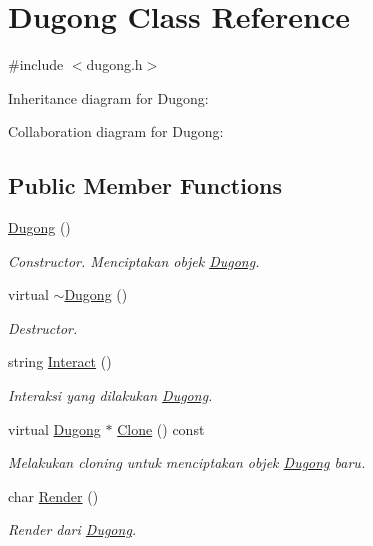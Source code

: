 \hypertarget{classDugong}{}\section{Dugong Class Reference}
\label{classDugong}


{\ttfamily \#include $<$dugong.\+h$>$}



Inheritance diagram for Dugong\+:


Collaboration diagram for Dugong\+:
\subsection*{Public Member Functions}
\begin{DoxyCompactItemize}
\item 
\hyperlink{classDugong_ab18a993807c0daa4b4a7eeaf7118ead7}{Dugong} ()
\begin{DoxyCompactList}\small\item\em Constructor. Menciptakan objek \hyperlink{classDugong}{Dugong}. \end{DoxyCompactList}\item 
virtual \hyperlink{classDugong_a0fe188826a301ecf2b90f2eb60c9e5da}{$\sim$\+Dugong} ()
\begin{DoxyCompactList}\small\item\em Destructor. \end{DoxyCompactList}\item 
string \hyperlink{classDugong_a861c589c05a791faf03297eb6e718d9e}{Interact} ()
\begin{DoxyCompactList}\small\item\em Interaksi yang dilakukan \hyperlink{classDugong}{Dugong}. \end{DoxyCompactList}\item 
virtual \hyperlink{classDugong}{Dugong} $\ast$ \hyperlink{classDugong_a8209b4208bd32dfc0fa4e701679306c1}{Clone} () const 
\begin{DoxyCompactList}\small\item\em Melakukan cloning untuk menciptakan objek \hyperlink{classDugong}{Dugong} baru. \end{DoxyCompactList}\item 
char \hyperlink{classDugong_af82a8983c960604aa27dabe7fec53362}{Render} ()
\begin{DoxyCompactList}\small\item\em Render dari \hyperlink{classDugong}{Dugong}. \end{DoxyCompactList}\end{DoxyCompactItemize}
